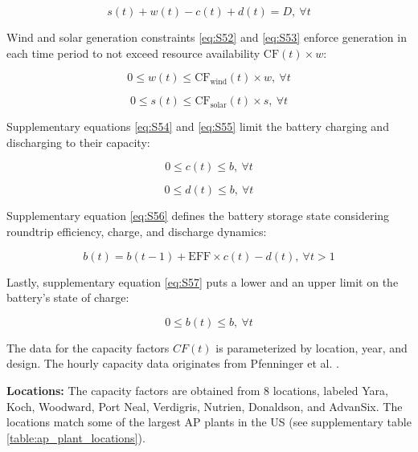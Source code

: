 \documentclass{article}
\begin{document}
\begin{equation}
s(t) + w(t) - c(t) + d(t) = D, \ \forall t
\label{eq:S51}
\end{equation}

Wind and solar generation constraints \eqref{eq:S52} and \eqref{eq:S53} enforce generation in each time period to not exceed resource availability \(\text{CF}(t) \times w\):

\begin{equation}
0 \leq w(t) \leq \text{CF}_{\text{wind}}(t) \times w, \ \forall t
\label{eq:S52}
\end{equation}

\begin{equation}
0 \leq s(t) \leq \text{CF}_{\text{solar}}(t) \times s, \ \forall t
\label{eq:S53}
\end{equation}

Supplementary equations \eqref{eq:S54} and \eqref{eq:S55} limit the battery charging and discharging to their capacity:

\begin{equation}
0 \leq c(t) \leq b, \ \forall t
\label{eq:S54}
\end{equation}

\begin{equation}
0 \leq d(t) \leq b, \ \forall t
\label{eq:S55}
\end{equation}

Supplementary equation \eqref{eq:S56} defines the battery storage state considering roundtrip efficiency, charge, and discharge dynamics:

\begin{equation}
b(t) = b(t-1) + \text{EFF} \times c(t) - d(t), \ \forall t > 1
\label{eq:S56}
\end{equation}

Lastly, supplementary equation \eqref{eq:S57} puts a lower and an upper limit on the battery's state of charge:

\begin{equation}
0 \leq b(t) \leq b, \ \forall t
\label{eq:S57}
\end{equation}

The data for the capacity factors \( CF(t) \) is parameterized by location, year, and design. The hourly capacity data originates from Pfenninger et al. \cite{Pfenninger2016}.

\textbf{Locations:} The capacity factors are obtained from 8 locations, labeled Yara, Koch, Woodward, Port Neal, Verdigris, Nutrien, Donaldson, and AdvanSix. The locations match some of the largest AP plants in the US (see supplementary table \ref{table:ap_plant_locations}).
\end{document}
